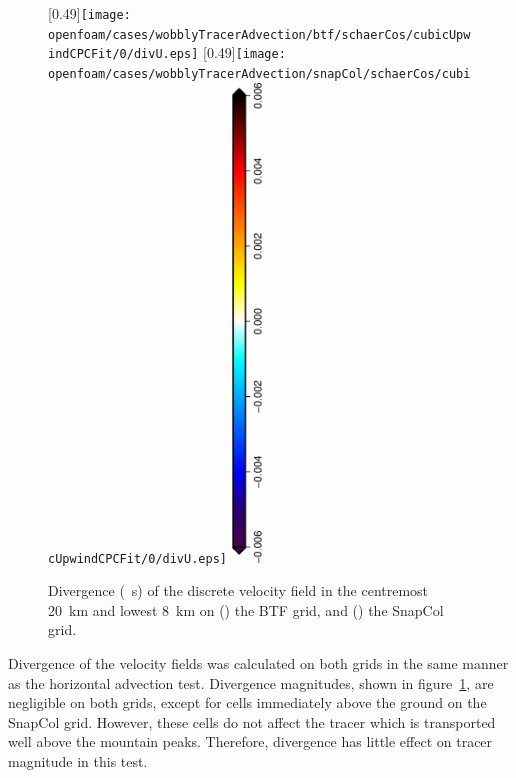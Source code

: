 \begin{figure}
	\captionsetup[subfigure]{position=b}
	\centering
%
	[0.49\textwidth]{\texttt{[image: openfoam/cases/wobblyTracerAdvection/btf/schaerCos/cubicUpwindCPCFit/0/divU.eps]}}
	\hfill
	[0.49\textwidth]{\texttt{[image: openfoam/cases/wobblyTracerAdvection/snapCol/schaerCos/cubicUpwindCPCFit/0/divU.eps]}}
%
	\includegraphics[height=5in,angle=270]{legends/divU.eps}
%
	\caption{Divergence (\si{\per\second}) of the discrete velocity field in the centremost \SI{20}{\kilo\meter} and lowest \SI{8}{\kilo\meter} on () the BTF grid, and () the SnapCol grid.}
	\label{fig:wobblyTracerAdvection:div}
\end{figure}

Divergence of the velocity fields was calculated on both grids in the same manner as the horizontal advection test.  Divergence magnitudes, shown in figure~\ref{fig:wobblyTracerAdvection:div}, are negligible on both grids, except for cells immediately above the ground on the SnapCol grid.  However, these cells do not affect the tracer which is transported well above the mountain peaks.  Therefore, divergence has little effect on tracer magnitude in this test.

